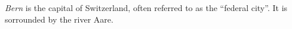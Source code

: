\emph{Bern} is the capital of Switzerland, often referred to as the ``federal city''.
It is sorrounded by the river Aare.